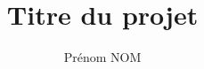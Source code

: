 \documentclass[pfe ,titlesmallcaps]{isipfe}
\begin{document}
  

\frontmatter

\title{Titre du projet}
\author{Prénom NOM}





\setcounter{secnumdepth}{3}
\setcounter{tocdepth}{2}
\tableofcontents


\listoffigures
\listoftables


\mainmatter











%




%
%


\backmatter


\renewcommand\bibname{References}


\end{document}
